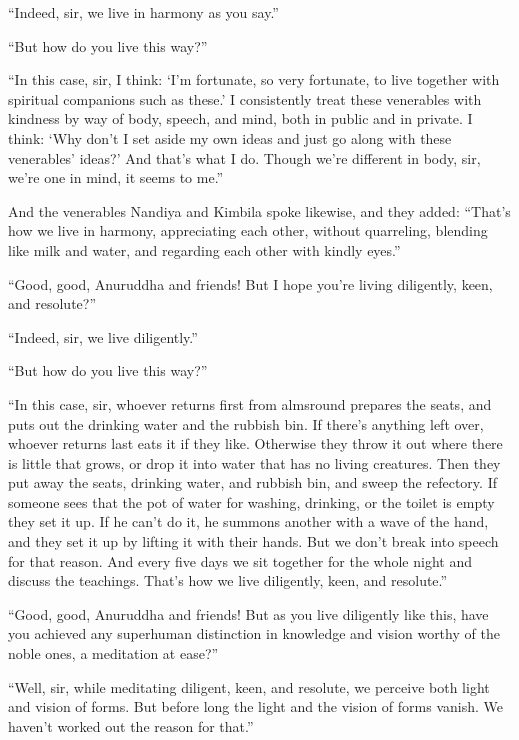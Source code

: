\documentclass[12pt,openany]{book}%
\begin{document}
“Indeed, sir, we live in harmony as you say.” 

“But how do you live this way?” 

“In this case, sir, I think: ‘I’m fortunate, so very fortunate, to live together with spiritual companions such as these.’ I consistently treat these venerables with kindness by way of body, speech, and mind, both in public and in private. I think: ‘Why don’t I set aside my own ideas and just go along with these venerables’ ideas?’ And that’s what I do. Though we’re different in body, sir, we’re one in mind, it seems to me.” 

And the venerables Nandiya and Kimbila spoke likewise, and they added: “That’s how we live in harmony, appreciating each other, without quarreling, blending like milk and water, and regarding each other with kindly eyes.” 

“Good, good, Anuruddha and friends! But I hope you’re living diligently, keen, and resolute?” 

“Indeed, sir, we live diligently.” 

“But how do you live this way?” 

“In this case, sir, whoever returns first from almsround prepares the seats, and puts out the drinking water and the rubbish bin. If there’s anything left over, whoever returns last eats it if they like. Otherwise they throw it out where there is little that grows, or drop it into water that has no living creatures. Then they put away the seats, drinking water, and rubbish bin, and sweep the refectory. If someone sees that the pot of water for washing, drinking, or the toilet is empty they set it up. If he can’t do it, he summons another with a wave of the hand, and they set it up by lifting it with their hands. But we don’t break into speech for that reason. And every five days we sit together for the whole night and discuss the teachings. That’s how we live diligently, keen, and resolute.” 

“Good, good, Anuruddha and friends! But as you live diligently like this, have you achieved any superhuman distinction in knowledge and vision worthy of the noble ones, a meditation at ease?” 

“Well, sir, while meditating diligent, keen, and resolute, we perceive both light and vision of forms. But before long the light and the vision of forms vanish. We haven’t worked out the reason for that.” 
\end{document}
